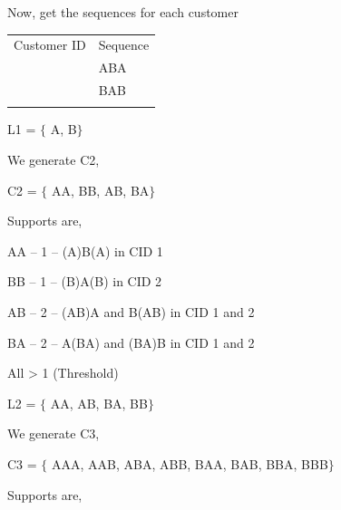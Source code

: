 \documentclass[12pt]{article}
\renewcommand{\_}{\kern-1.5pt\textunderscore\kern-1.5pt}
\begin{document}
\begin{enumerate}
Now, get the sequences for each customer\par





\begin{table}[H]
 			\centering
\begin{tabular}{p{3.05in}p{3.05in}}
\hline
\multicolumn{1}{|p{3.05in}}{Customer ID} & 
\multicolumn{1}{|p{3.05in}|}{Sequence} \\
\hhline{--}
\multicolumn{1}{|p{3.05in}}{1} & 
\multicolumn{1}{|p{3.05in}|}{ABA} \\
\hhline{--}
\multicolumn{1}{|p{3.05in}}{2} & 
\multicolumn{1}{|p{3.05in}|}{BAB} \\
\hhline{--}

\end{tabular}
 \end{table}




\vspace{\baselineskip}
L1 = $ \{ $ A, B$ \} $ \par

We generate C2, \par

C2 = $ \{ $ AA, BB, AB, BA$ \} $ \par

Supports are, \par

AA – 1 – (A)B(A) in CID 1\par

BB – 1 – (B)A(B) in CID 2\par

AB – 2 – (AB)A and B(AB) in CID 1 and 2\par

BA – 2 – A(BA) and (BA)B in CID 1 and 2\par

All > 1 (Threshold)\par

L2 = $ \{ $ AA, AB, BA, BB$ \} $ \par

We generate C3, \par

C3 = $ \{ $ AAA, AAB, ABA, ABB, BAA, BAB, BBA, BBB$ \} $ \par

Supports are, \par


\end{enumerate}
\end{document}

